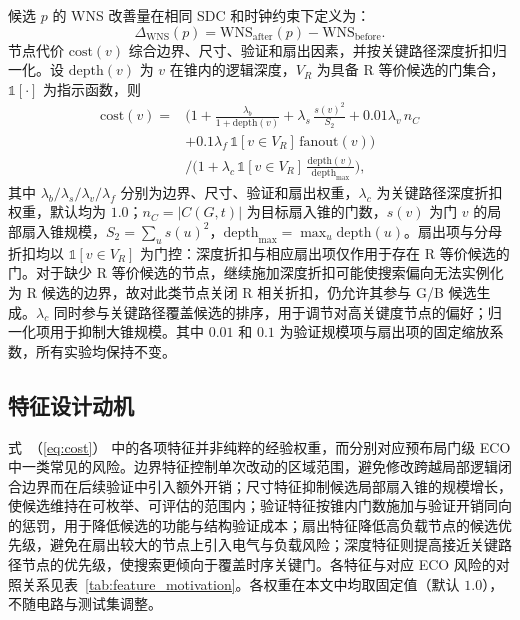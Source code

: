 \documentclass[twocolumn,10pt,fontset=windows]{ctexart}
\renewcommand{\eqref}[1]{\textup{（\ref{#1}）}}
\begin{document}
候选 $p$ 的 WNS 改善量在相同 SDC 和时钟约束下定义为：
\begin{equation}\label{eq:dtiming}
\Delta_{\mathrm{WNS}}(p) = \mathrm{WNS}_{\mathrm{after}}(p) - \mathrm{WNS}_{\mathrm{before}}.
\end{equation}
节点代价 $\mathrm{cost}(v)$ 综合边界、尺寸、验证和扇出因素，并按关键路径深度折扣归一化。设 $\mathrm{depth}(v)$ 为 $v$ 在锥内的逻辑深度，$V_R$ 为具备 R 等价候选的门集合，$\mathbb{1}[\cdot]$ 为指示函数，则
{\small
\begin{equation}
\label{eq:cost}
\begin{aligned}
\mathrm{cost}(v) ={}& \Big(1 + \frac{\lambda_b}{1+\mathrm{depth}(v)}
 + \lambda_s\,\frac{s(v)^2}{S_2}
 + 0.01\lambda_v\,n_C \\
 &+ 0.1\lambda_f\,\mathbb{1}[v{\in}V_R]\,\mathrm{fanout}(v)\Big) \\
 &\Big/\Big(1 + \lambda_c\,\mathbb{1}[v{\in}V_R]\,
 \frac{\mathrm{depth}(v)}{\mathrm{depth}_{\max}}\Big),
\end{aligned}
\end{equation}
}
其中 $\lambda_b/\lambda_s/\lambda_v/\lambda_f$ 分别为边界、尺寸、验证和扇出权重，$\lambda_c$ 为关键路径深度折扣权重，默认均为 $1.0$；$n_C=|C(G,t)|$ 为目标扇入锥的门数，$s(v)$ 为门 $v$ 的局部扇入锥规模，$S_2=\sum_u s(u)^2$，$\mathrm{depth}_{\max}=\max_u \mathrm{depth}(u)$。扇出项与分母折扣均以 $\mathbb{1}[v{\in}V_R]$ 为门控：深度折扣与相应扇出项仅作用于存在 R 等价候选的门。对于缺少 R 等价候选的节点，继续施加深度折扣可能使搜索偏向无法实例化为 R 候选的边界，故对此类节点关闭 R 相关折扣，仍允许其参与 G/B 候选生成。$\lambda_c$ 同时参与关键路径覆盖候选的排序，用于调节对高关键度节点的偏好；归一化项用于抑制大锥规模。其中 $0.01$ 和 $0.1$ 为验证规模项与扇出项的固定缩放系数，所有实验均保持不变。

\subsection{特征设计动机}\label{sec:feature_motivation}

式~\eqref{eq:cost} 中的各项特征并非纯粹的经验权重，而分别对应预布局门级 ECO 中一类常见的风险。边界特征控制单次改动的区域范围，避免修改跨越局部逻辑闭合边界而在后续验证中引入额外开销；尺寸特征抑制候选局部扇入锥的规模增长，使候选维持在可枚举、可评估的范围内；验证特征按锥内门数施加与验证开销同向的惩罚，用于降低候选的功能与结构验证成本；扇出特征降低高负载节点的候选优先级，避免在扇出较大的节点上引入电气与负载风险；深度特征则提高接近关键路径节点的优先级，使搜索更倾向于覆盖时序关键门。各特征与对应 ECO 风险的对照关系见表~\ref{tab:feature_motivation}。各权重在本文中均取固定值（默认 $1.0$），不随电路与测试集调整。
\end{document}
